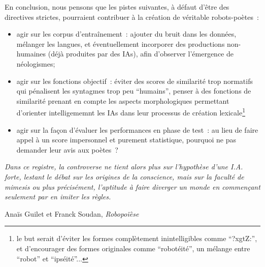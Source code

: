 \documentclass{article}
\newenvironment{citationbox}
{\begin{center}
		\begin{minipage}{.8\textwidth}
		}
		{
		\end{minipage}	
\end{center}
}
\begin{document}
				En conclusion, nous pensons que les pistes suivantes, à défaut d'être des directives strictes, pourraient contribuer à la création de véritable robots-poètes~:
				\begin{itemize}
					\item agir sur les corpus d'entraînement~: ajouter du bruit dans les données, mélanger les langues, et éventuellement incorporer des productions non-humaines (déjà produites par des IAs), afin d'observer l'émergence de néologismes;
					\item agir sur les fonctions objectif~: éviter des scores de similarité trop normatifs qui pénalisent les syntagmes trop peu ``humains'', penser à des fonctions de similarité prenant en compte les aspects morphologiques permettant d'orienter intelligememnt les IAs dans leur processus de création lexicale\footnote{le but serait d'éviter les formes complètement inintelligibles comme ``?xgtZ:'', et d'encourager des formes originales comme ``robotéité'', un mélange entre ``robot'' et ``ipséité''...}
					\item agir sur la façon d'évaluer les performances en phase de test~: au lieu de faire appel à un score impersonnel et purement statistique, pourquoi ne pas demander leur avis aux poètes~? 
				\end{itemize}
				
				

				
		
				\begin{citationbox}
					\textit{Dans ce registre, la controverse ne tient alors plus sur l'hypothèse d'une I.A. forte, lestant le débat sur les origines de la conscience, mais sur la faculté de mimesis ou plus précisément, l'aptitude à faire diverger un monde en commençant seulement par en imiter les règles.}
					\begin{flushright}
						Anaïs Guilet et Franck Soudan, \textit{Robopoïèse} \cite{guilet2017}
					\end{flushright}
				\end{citationbox}
	
		
	
		\newpage
\end{document}
